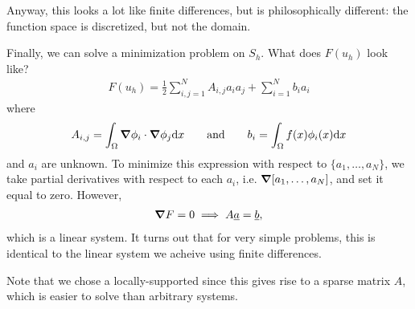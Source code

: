 \documentclass{article}
\begin{document}
                Anyway, this looks a lot like finite differences, but is philosophically different: the function space is discretized, but not the domain.

                Finally, we can solve a minimization problem on $S_h$.  What does $F(u_h)$ look like?
                \begin{align}
                    F(u_h) = \frac{1}{2}\sum_{i,j=1}^N A_{i,j}a_i a_j + \sum_{i=1}^N b_i a_i
                \end{align}
                where
                \begin{align}
                    A_{i,j} = \int_\Omega \grad \phi_i \cdot \grad \phi_j \dd x \qquad \text{and} \qquad b_i = \int_\Omega f(x) \phi_i(x) \dd x
                \end{align}
                and $a_i$ are unknown.  To minimize this expression with respect to $\{a_1, \dots, a_N\}$, we take partial derivatives with respect to each $a_i$, i.e. $\grad[a_1, \dots, a_N]$, and set it equal to zero.  However,
                \begin{align}
                    \grad F = 0 \implies A \underline{a} = \underline{b},
                \end{align}
                which is a linear system.  It turns out that for very simple problems, this is identical to the linear system we acheive using finite differences.

                Note that we chose a locally-supported since this gives rise to a sparse matrix $A$, which is easier to solve than arbitrary systems.
\end{document}
